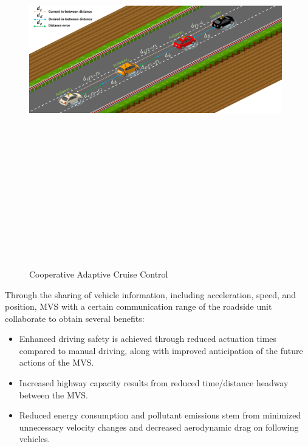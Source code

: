         \begin{figure}[h!]
        \centering 
        \includegraphics[width=11cm,height=18cm,keepaspectratio]{chapters/Chapitre_3/Figures/cooperative_adaptive_cruise_control}
        \caption{Cooperative Adaptive Cruise Control}
        \label{fig:CACC}
        \end{figure}



Through the sharing of vehicle information, including acceleration, speed, and position, MVS with a certain communication range of the roadside unit collaborate to obtain several benefits: 

\begin{itemize}
    \item Enhanced driving safety is achieved through reduced actuation times compared to manual driving, along with improved anticipation of the future actions of the MVS. 

    \item Increased highway capacity results from reduced time/distance headway between the MVS. 

    \item Reduced energy consumption and pollutant emissions stem from minimized unnecessary velocity changes and decreased aerodynamic drag on following vehicles. 
\end{itemize}



